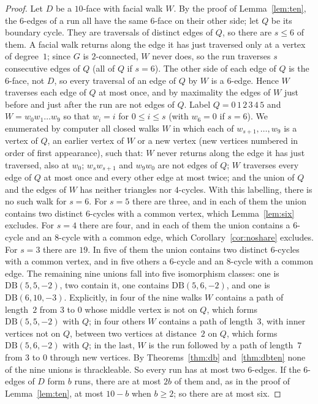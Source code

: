 \documentclass[11pt]{amsart}
\theoremstyle{definition}
\theoremstyle{remark}
\numberwithin{equation}{section}
\newcommand{\DB}{\mathrm{DB}}
\begin{document}
\begin{proof}
Let $D$ be a $10$-face with facial walk $W$. By the proof of Lemma~\ref{lem:ten}, the $6$-edges of a run all have the same $6$-face on their other side; let $Q$ be its boundary cycle. They are traversals of distinct edges of $Q$, so there are $s\le6$ of them. A facial walk returns along the edge it has just traversed only at a vertex of degree~$1$; since $G$ is $2$-connected, $W$ never does, so the run traverses $s$ consecutive edges of $Q$ (all of $Q$ if $s=6$). The other side of each edge of $Q$ is the $6$-face, not $D$, so every traversal of an edge of $Q$ by $W$ is a $6$-edge. Hence $W$ traverses each edge of $Q$ at most once, and by maximality the edges of $W$ just before and just after the run are not edges of $Q$. Label $Q=0\,1\,2\,3\,4\,5$ and $W=w_0w_1\dots w_9$ so that $w_i=i$ for $0\le i\le s$ (with $w_6=0$ if $s=6$). We enumerated by computer all closed walks $W$ in which each of $w_{s+1},\dots,w_9$ is a vertex of $Q$, an earlier vertex of $W$ or a new vertex (new vertices numbered in order of first appearance), such that: $W$ never returns along the edge it has just traversed, also at $w_0$; $w_sw_{s+1}$ and $w_9w_0$ are not edges of $Q$; $W$ traverses every edge of $Q$ at most once and every other edge at most twice; and the union of $Q$ and the edges of $W$ has neither triangles nor $4$-cycles. With this labelling, there is no such walk for $s=6$. For $s=5$ there are three, and in each of them the union contains two distinct $6$-cycles with a common vertex, which Lemma~\ref{lem:six} excludes. For $s=4$ there are four, and in each of them the union contains a $6$-cycle and an $8$-cycle with a common edge, which Corollary~\ref{cor:noshare} excludes. For $s=3$ there are $19$. In five of them the union contains two distinct $6$-cycles with a common vertex, and in five others a $6$-cycle and an $8$-cycle with a common edge. The remaining nine unions fall into five isomorphism classes: one is $\DB(5,5,-2)$, two contain it, one contains $\DB(5,6,-2)$, and one is $\DB(6,10,-3)$. Explicitly, in four of the nine walks $W$ contains a path of length~$2$ from $3$ to $0$ whose middle vertex is not on $Q$, which forms $\DB(5,5,-2)$ with $Q$; in four others $W$ contains a path of length~$3$, with inner vertices not on $Q$, between two vertices at distance~$2$ on $Q$, which forms $\DB(5,6,-2)$ with $Q$; in the last, $W$ is the run followed by a path of length~$7$ from $3$ to $0$ through new vertices. By Theorems~\ref{thm:db} and~\ref{thm:dbten} none of the nine unions is thrackleable. So every run has at most two $6$-edges. If the $6$-edges of $D$ form $b$ runs, there are at most $2b$ of them and, as in the proof of Lemma~\ref{lem:ten}, at most $10-b$ when $b\ge2$; so there are at most six.
\end{proof}
\end{document}
